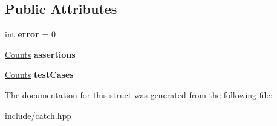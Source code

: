 \subsection*{Public Attributes}
\begin{DoxyCompactItemize}
\item 
int {\bfseries error} = 0\hypertarget{structCatch_1_1Totals_a6ea14c7de7ea735a14f172a26e08a239}{}\label{structCatch_1_1Totals_a6ea14c7de7ea735a14f172a26e08a239}

\item 
\hyperlink{structCatch_1_1Counts}{Counts} {\bfseries assertions}\hypertarget{structCatch_1_1Totals_a885ded66df752147b30c3d45aa602ec9}{}\label{structCatch_1_1Totals_a885ded66df752147b30c3d45aa602ec9}

\item 
\hyperlink{structCatch_1_1Counts}{Counts} {\bfseries test\+Cases}\hypertarget{structCatch_1_1Totals_adb195fe477aedee2ecea88c888f16506}{}\label{structCatch_1_1Totals_adb195fe477aedee2ecea88c888f16506}

\end{DoxyCompactItemize}


The documentation for this struct was generated from the following file\+:\begin{DoxyCompactItemize}
\item 
include/catch.\+hpp\end{DoxyCompactItemize}
